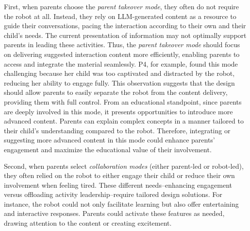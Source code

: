 First, when parents choose the \textit{parent takeover mode}, they often do not require the robot at all. Instead, they rely on LLM-generated content as a resource to guide their conversations, pacing the interaction according to their own and their child's needs. The current presentation of information may not optimally support parents in leading these activities.  Thus, the \textit{parent takeover mode} should focus on delivering suggested interaction content more efficiently, enabling parents to access and integrate the material seamlessly. P4, for example, found this mode challenging because her child was too captivated and distracted by the robot, reducing her ability to engage fully. This observation suggests that the design should allow parents to easily separate the robot from the content delivery, providing them with full control. From an educational standpoint, since parents are deeply involved in this mode, it presents opportunities to introduce more advanced content. Parents can explain complex concepts in a manner tailored to their child’s understanding compared to the robot. Therefore, integrating or suggesting more advanced content in this mode could enhance parents' engagement and maximize the educational value of their involvement.

Second, when parents select \textit{collaboration modes} (either parent-led or robot-led), they often relied on the robot to either engage their child or reduce their own involvement when feeling tired. 
These different needs--enhancing engagement versus offloading activity leadership--require tailored design solutions. For instance, the robot could not only facilitate learning but also offer entertaining and interactive responses. Parents could activate these features as needed, drawing attention to the content or creating excitement.

